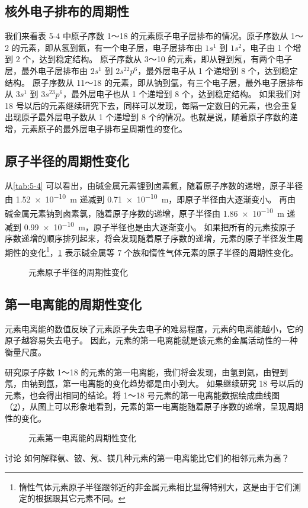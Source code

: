 \subsection{核外电子排布的周期性}
我们来看表 5-4 中原子序数 1～18 的元素原子电子层排布的情况。原子序数从 1～2 的元素，即从氢到氦，有一个电子层，电子层排布由 $1s^1$ 到 $1s^2$，电子由 1 个增到 2 个，达到稳定结构。
原子序数从 3～10 的元素，即从锂到氖，有两个电子层，最外电子层排布由 $2s^1$ 到 $2s^22p^6$，最外层电子从 1 个递增到 8 个，达到稳定结构。
原子序数从 11～18 的元素，即从钠到氩，有三个电子层，最外电子层排布从 $3s^1$ 到 $3s^23p^6$，最外层电子也从 1 个递增到 8 个，达到稳定结构。
如果我们对 18 号以后的元素继续研究下去，同样可以发现，每隔一定数目的元素，也会重复出现原子最外层电子数从 1 个递增到 8 个的情况。也就是说，随着原子序数的递增，元素原子的最外层电子排布呈周期性的变化。

\subsection{原子半径的周期性变化}
从\cref{tab:5-4} 可以看出，由碱金属元素锂到卤素氟，随着原子序数的递增，原子半径由 \qty{1.52e-10}{m} 递减到 \qty{0.71e-10}{m}，即原子半径由大逐渐变小。
再由碱金属元素钠到卤素氯，随着原子序数的递增，原子半径由 \qty{1.86e-10}{m} 递减到 \qty{0.99e-10}{m}，原子半径也是由大逐渐变小。
如果把所有的元素按原子序数递增的顺序排列起来，将会发现随着原子序数的递增，元素的原子半径发生周期性的变化\footnote{惰性气体元素原子半径跟邻近的非金属元素相比显得特别大，这是由于它们测定的根据跟其它元素不同。}，\cref{fig:5-8} 表示碱金属等 7 个族和惰性气体元素的原子半径的周期性变化。
\begin{figure}
  \caption{元素原子半径的周期性变化}\label{fig:5-8}
\end{figure}


\subsection{第一电离能的周期性变化}
元素电离能的数值反映了元素原子失去电子的难易程度，元素的电离能越小，它的原子越容易失去电子。
因此，元素的第一电离能就是该元素的金属活动性的一种衡量尺度。

研究原子序数 1～18 的元素的第一电离能，我们将会发现，由氢到氦，由锂到氖，由钠到氩，第一电离能的变化趋势都是由小到大。
如果继续研究 18 号以后的元素，也会得出相同的结论。将 1～18 号元素的第一电离能数据绘成曲线图（\cref{fig:5-9}），从图上可以形象地看到，元素的第一电离能随着原子序数的递增，呈现周期性的变化。
\begin{figure}
  \caption{元素第一电离能的周期性变化}\label{fig:5-9}
\end{figure}
\begin{Theorem}{讨论}
  如何解释氨、铍、氖、镁几种元素的第一电离能比它们的相邻元素为高？
\end{Theorem}

